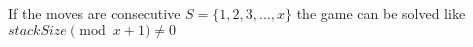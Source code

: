 If the moves are consecutive $S = \{1, 2, 3,..., x\}$ the game can be solved like $stackSize \pmod{x + 1} \neq 0$ \\